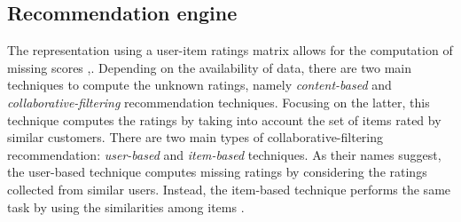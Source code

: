 

\subsection{Recommendation engine}

The representation using a user-item ratings matrix allows for the computation of missing scores \cite{Aggarwal2016},\cite{DBLP:conf/rweb/NoiaO15}. Depending on the availability of data, there are two main techniques to compute the unknown ratings, namely \emph{content-based} \cite{Pazzani2007} and \emph{collaborative-filtering} \cite{Miranda:2008:ICF:1486927.1487083} recommendation techniques. Focusing on the latter, this technique computes the ratings by taking into account the set of items rated by similar customers. There are two main types of collaborative-filtering recommendation: \emph{user-based} \cite{Zhao:2010:UCR:1748610.1749278} and \emph{item-based} \cite{Sarwar:2001:ICF:371920.372071} techniques. As their names suggest, the user-based technique computes missing ratings by considering the ratings collected from similar users. Instead, the item-based technique performs the same task by using the similarities among items \cite{Cremonesi:2008:EMC:1468165.1468327}.

